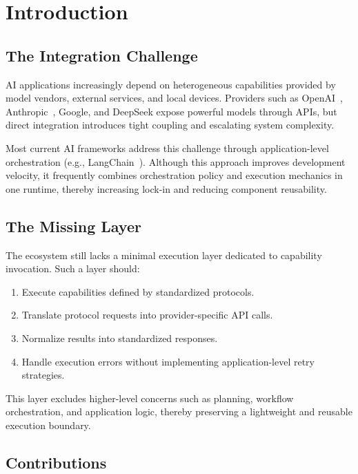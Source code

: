 \section{Introduction}

\subsection{The Integration Challenge}

AI applications increasingly depend on heterogeneous capabilities provided by model vendors, external services, and local devices. Providers such as OpenAI~\cite{openai_docs}, Anthropic~\cite{anthropic_docs}, Google, and DeepSeek expose powerful models through APIs, but direct integration introduces tight coupling and escalating system complexity.

Most current AI frameworks address this challenge through application-level orchestration (e.g., LangChain~\cite{langchain_docs}). Although this approach improves development velocity, it frequently combines orchestration policy and execution mechanics in one runtime, thereby increasing lock-in and reducing component reusability.

\subsection{The Missing Layer}

The ecosystem still lacks a minimal execution layer dedicated to capability invocation. Such a layer should:

\begin{enumerate}[leftmargin=1.5em]
    \item Execute capabilities defined by standardized protocols.
    \item Translate protocol requests into provider-specific API calls.
    \item Normalize results into standardized responses.
    \item Handle execution errors without implementing application-level retry strategies.
\end{enumerate}

This layer excludes higher-level concerns such as planning, workflow orchestration, and application logic, thereby preserving a lightweight and reusable execution boundary.

\subsection{Contributions}

